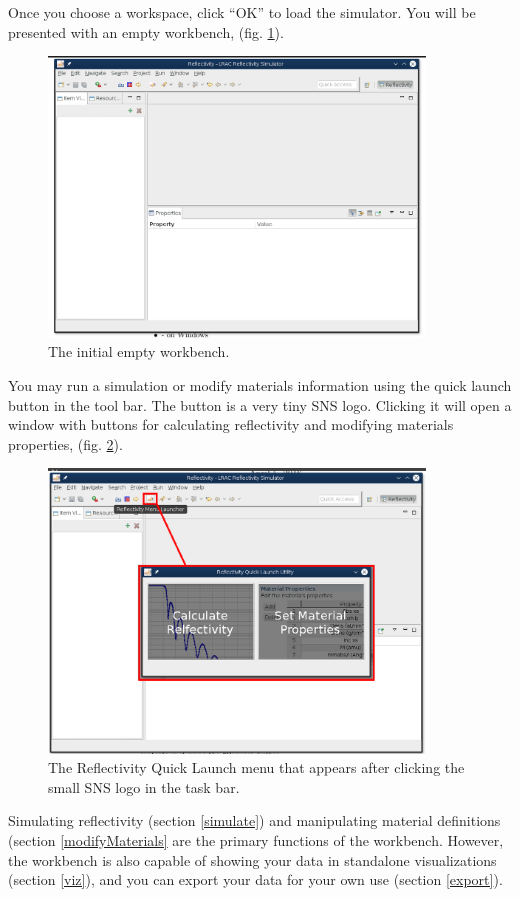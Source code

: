 Once you choose a workspace, click ``OK'' to load the simulator. You will be
presented with an empty workbench, (fig. \ref{workbench}).

\begin{figure}[!h]
\centering
\includegraphics[width=10cm]{images/workbench.png}
\caption{The initial empty workbench.}
\label{workbench}
\end{figure}

You may run a simulation or modify materials information using the quick launch
button in the tool bar. The button is a very tiny SNS logo. Clicking it
will open a window with buttons for calculating reflectivity and modifying
materials properties, (fig. \ref{launcher}).

\begin{figure}[!h]
\centering
\includegraphics[width=10cm]{images/menuLauncher.png}
\caption{The Reflectivity Quick Launch menu that appears after clicking the
small SNS logo in the task bar.}
\label{launcher}
\end{figure}

Simulating reflectivity (section \ref{simulate}) and manipulating material
definitions (section \ref{modifyMaterials} are the primary functions of the
workbench. However, the workbench is also capable of showing your data in
standalone visualizations (section \ref{viz}), and you can export your data for
your own use (section \ref{export}).

